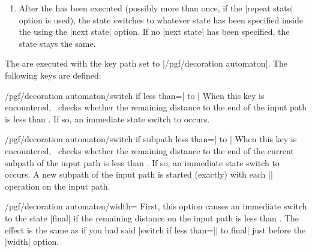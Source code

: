\begin{command}{\pgfdeclaredecoration{}}
\begin{command}{\state{}}
\begin{enumerate}
\begin{codeexample}[]
\tikz\path[decorate, decoration=stars, star point ratio=2, star points=5,
           inner sep=0, minimum size=rnd*10pt+2pt]            
  (0,0) .. controls (0,2)  and (3,2)  .. (3,0)
        .. controls (3,-3) and (0,0)  .. (0,-3)
        .. controls (0,-5) and (3,-5) .. (3,-3);
\end{codeexample}

    \item
      After the  has been executed (possibly more than
      once, if the |repeat state| option is used), the state switches to
      whatever state has been specified inside the 
      using the |next state| option. If no |next state| has been
      specified, the state stays the same.
    \end{enumerate}

    The  are executed with the key path set to
    |/pgf/decoration automaton|. The following keys are defined:
    \begin{key}{/pgf/decoration automaton/switch if less than=| to |}
      When this key is encountered, \pgfname\ checks whether the
      remaining distance to the end of the input path is less than
      . If so, an immediate state switch to  occurs.
    \end{key}
    \begin{key}{/pgf/decoration automaton/switch if subpath less than=| to |}
      When this key is encountered, \pgfname\ checks whether the
      remaining distance to the end of the current subpath of the
      input path is less than . If so, an immediate
      state switch to  occurs. A new subpath of the
      input path is started (exactly) with each |\pgfpathmoveto|
      operation on the input path.
    \end{key}
    \begin{key}{/pgf/decoration automaton/width=}
      First, this option causes an immediate switch to the
      state |final| if the remaining distance on the input path is
      less than . The effect is the same as if you had
      said |switch if less than=|| to final| just
      before the |width| option.


\end{key}
\end{command}
\end{command}
